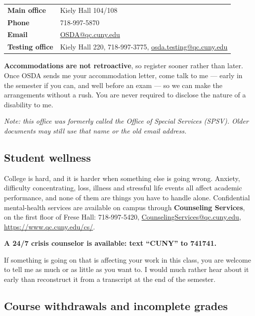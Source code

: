 \documentclass[11pt]{article}
\begin{document}
\begin{center}
\renewcommand{\arraystretch}{1.25}
\begin{tabular}{@{} >{\bfseries}l l @{}}
\toprule
Main office & Kiely Hall 104/108 \\
Phone       & 718-997-5870 \\
Email       & \href{mailto:OSDA@qc.cuny.edu}{OSDA@qc.cuny.edu} \\
Testing office & Kiely Hall 220, 718-997-3775,
                 \href{mailto:osda.testing@qc.cuny.edu}{osda.testing@qc.cuny.edu} \\
\bottomrule
\end{tabular}
\end{center}

\textbf{Accommodations are not retroactive}, so register sooner rather than
later. Once OSDA sends me your accommodation letter, come talk to me --- early
in the semester if you can, and well before an exam --- so we can make the
arrangements without a rush. You are never required to disclose the nature of a
disability to me.

\emph{Note: this office was formerly called the Office of Special Services
(SPSV). Older documents may still use that name or the old email address.}

\subsection{Student wellness}

College is hard, and it is harder when something else is going wrong. Anxiety,
difficulty concentrating, loss, illness and stressful life events all affect
academic performance, and none of them are things you have to handle alone.
Confidential mental-health services are available on campus through
\textbf{Counseling Services}, on the first floor of Frese Hall:
718-997-5420, \href{mailto:CounselingServices@qc.cuny.edu}{CounselingServices@qc.cuny.edu},
\url{https://www.qc.cuny.edu/cs/}.

\textbf{A 24/7 crisis counselor is available: text ``CUNY'' to 741741.}

If something is going on that is affecting your work in this class, you are
welcome to tell me as much or as little as you want to. I would much rather hear
about it early than reconstruct it from a transcript at the end of the semester.

\subsection{Course withdrawals and incomplete grades}
\end{document}
